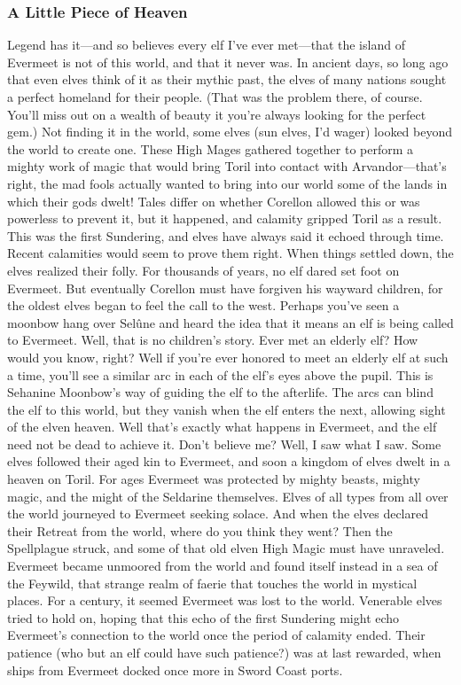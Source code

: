 \documentclass[10pt,a4paper,twoside,twocolumn,openany,bg=print,nodeprecatedcode]{dndbook}
\begin{document}
\subsubsection{A Little Piece of Heaven}
Legend has it—and so believes every elf I've ever met—that the island of Evermeet is not of this world, and that it never was. In ancient days, so long ago that even elves think of it as their mythic past, the elves of many nations sought a perfect homeland for their people. (That was the problem there, of course. You'll miss out on a wealth of beauty it you're always looking for the perfect gem.) Not finding it in the world, some elves (sun elves, I'd wager) looked beyond the world to create one. These High Mages gathered together to perform a mighty work of magic that would bring Toril into contact with Arvandor—that's right, the mad fools actually wanted to bring into our world some of the lands in which their gods dwelt!
Tales differ on whether Corellon allowed this or was powerless to prevent it, but it happened, and calamity gripped Toril as a result. This was the first Sundering, and elves have always said it echoed through time. Recent calamities would seem to prove them right.
When things settled down, the elves realized their folly. For thousands of years, no elf dared set foot on Evermeet. But eventually Corellon must have forgiven his wayward children, for the oldest elves began to feel the call to the west.
Perhaps you've seen a moonbow hang over Selûne and heard the idea that it means an elf is being called to Evermeet. Well, that is no children's story. Ever met an elderly elf? How would you know, right? Well if you're ever honored to meet an elderly elf at such a time, you'll see a similar arc in each of the elf's eyes above the pupil. This is Sehanine Moonbow's way of guiding the elf to the afterlife. The arcs can blind the elf to this world, but they vanish when the elf enters the next, allowing sight of the elven heaven. Well that's exactly what happens in Evermeet, and the elf need not be dead to achieve it. Don't believe me? Well, I saw what I saw.
Some elves followed their aged kin to Evermeet, and soon a kingdom of elves dwelt in a heaven on Toril. For ages Evermeet was protected by mighty beasts, mighty magic, and the might of the Seldarine themselves. Elves of all types from all over the world journeyed to Evermeet seeking solace. And when the elves declared their Retreat from the world, where do you think they went?
Then the Spellplague struck, and some of that old elven High Magic must have unraveled. Evermeet became unmoored from the world and found itself instead in a sea of the Feywild, that strange realm of faerie that touches the world in mystical places. For a century, it seemed Evermeet was lost to the world. Venerable elves tried to hold on, hoping that this echo of the first Sundering might echo Evermeet's connection to the world once the period of calamity ended.
Their patience (who but an elf could have such patience?) was at last rewarded, when ships from Evermeet docked once more in Sword Coast ports.
\end{document}
